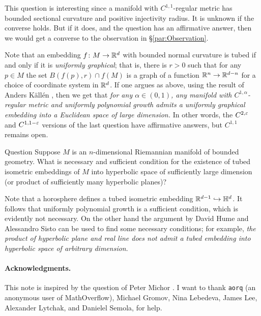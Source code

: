 \documentclass[a4paper,10pt]{article}
\begin{document}
This question is interesting since a manifold with $C^{1,1}$-regular metric has bounded sectional curvature and positive injectivity radius.
It is unknown if the converse holds.
But if it does, and the question has an affirmative answer,
then we would get a converse to the observation in 
§\ref{par:Observation}.

Note that an embedding $f\colon M\to \mathbb{R}^d$ with bounded normal curvature is tubed if and only if it is \emph{uniformly graphical};
that is, there is $r>0$ such that for any $p\in M$ the set $B(f(p),r)\cap f(M)$ is a graph of a function $\mathbb{R}^n\to \mathbb{R}^{d-n}$ for a choice of coordinate system in $\mathbb{R}^d$.
If one argues as above, using the result of Anders K\"{a}ll\'{e}n \cite{kallen}, then we get that 
\textit{for any $\alpha\in(0,1)$, any manifold with $C^{1,\alpha}$-regular metric and uniformly polynomial growth admits a uniformly graphical embedding into a Euclidean space of large dimension.}
In other words, the $C^{2,\varepsilon}$ and $C^{1,1-\varepsilon}$ versions of the last question have affirmative answers, but $C^{1,1}$ remains open.

\begin{thm}{Question}
Suppose $M$ is an $n$-dimensional Riemannian manifold of bounded geometry.
What is necessary and sufficient condition for the existence of tubed isometric embeddings of $M$
into hyperbolic space of sufficiently large dimension (or product of sufficiently many hyperbolic planes)?
\end{thm}

Note that a horosphere defines a tubed isometric embedding $\mathbb{R}^{d-1}\hookrightarrow\mathbb{H}^d$.
It follows that uniformly polynomial growth is a sufficient condition, which is evidently not necessary.
On the other hand the argument by David Hume and Alessandro Sisto \cite[1.1]{hume-sisto} can be used to find some necessary conditions; for example, \textit{the product of hyperbolic plane and real line does not admit a tubed embedding into hyperbolic space of arbitrary dimension}.

\paragraph{Acknowledgments.} 
This note is inspired by the question of Peter Michor \cite{124840}.
I want to thank 
\texttt{aorq} (an anonymous user of MathOverflow),
Michael Gromov,
Nina Lebedeva,
James Lee,
Alexander Lytchak, and
Danielel Semola,
for help.


{\sloppy
\def\emph{\textit}
\printbibliography[heading=bibintoc]
\fussy
}
\end{document}
